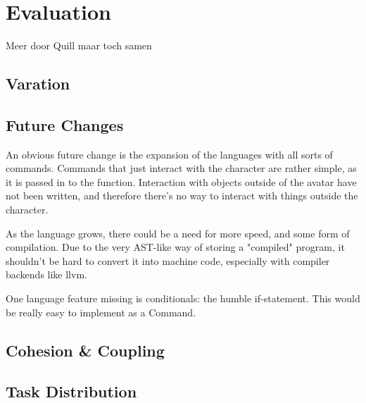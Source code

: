 \chapter{Evaluation}
Meer door Quill maar toch samen

\section{Varation}


\section{Future Changes}
An obvious future change is the expansion of the languages with all sorts of commands. Commands that just interact with the character are rather simple, as it is passed in to the function. Interaction
with objects outside of the avatar have not been written, and therefore there's no way to interact with things outside the character. 

As the language grows, there could be a need for more speed, and some form of compilation. Due to the very AST-like way of storing a "compiled" program, it shouldn't be hard to convert it into machine
code, especially with compiler backends like llvm.

One language feature missing is conditionals: the humble if-statement. This would be really easy to implement as a Command.

\section{Cohesion \& Coupling}


\section{Task Distribution}
